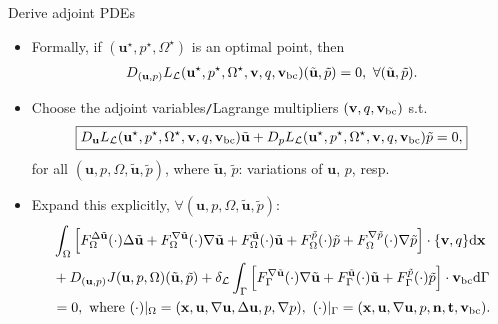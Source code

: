 \documentclass[10pt
hyperref={
    pdfauthor={Hong Quan Ba Nguyen},
    pdftitle={Optimal Shape Design of Air Ducts in Combustion Engines: Design a General Framework},
    pdfsubject={Talk},
    pdfcreator={LaTeX},
}
]{beamer}
\begin{document}
\begin{frame}{Derive adjoint PDEs}
    \begin{itemize}
        \item Formally, if $(\textbf{u}^\star,p^\star,\Omega^\star)$ is an optimal point, then
        \begin{align*}
            D_{(\textbf{u},p)}L_{\mathcal{L}}(\textbf{u}^\star,p^\star,\Omega^\star,\textbf{v},q,\textbf{v}_{\rm bc})(\tilde{\textbf{u}},\tilde{p}) = 0,\ \forall(\tilde{\textbf{u}},\tilde{p}).
        \end{align*}
        \item Choose the adjoint variables\texttt{/}Lagrange multipliers $(\textbf{v},q,\textbf{v}_{\rm bc})$ s.t.
        \begin{align*}
            \boxed{D_{\textbf{u}}L_{\mathcal{L}}(\textbf{u}^\star,p^\star,\Omega^\star,\textbf{v},q,\textbf{v}_{\rm bc})\tilde{\textbf{u}} + D_pL_{\mathcal{L}}(\textbf{u}^\star,p^\star,\Omega^\star,\textbf{v},q,\textbf{v}_{\rm bc})\tilde{p} = 0,}
        \end{align*}
        for all $(\textbf{u},p,\Omega,\tilde{\textbf{u}},\tilde{p})$, where $\tilde{\textbf{u}}$, $\tilde{p}$: variations of $\textbf{u}$, $p$, resp.
        \item Expand this explicitly, $\forall(\textbf{u},p,\Omega,\tilde{\textbf{u}},\tilde{p})$:
        \begin{align*}
            &\int_\Omega \left[F_\Omega^{\Delta\tilde{\textbf{u}}}(\cdot)\Delta\tilde{\textbf{u}} + F_\Omega^{\nabla\tilde{\textbf{u}}}(\cdot)\nabla\tilde{\textbf{u}} + F_\Omega^{\tilde{\textbf{u}}}(\cdot)\tilde{\textbf{u}} + F_\Omega^{\tilde{p}}(\cdot)\tilde{p} + F_\Omega^{\nabla\tilde{p}}(\cdot)\nabla\tilde{p}\right]\cdot\{\textbf{v},q\}{\rm d}\textbf{x}\\
            &+ D_{(\textbf{u},p)}J(\textbf{u},p,\Omega)(\tilde{\textbf{u}},\tilde{p}) + \delta_{\mathcal{L}}\int_\Gamma \left[F_\Gamma^{\nabla\tilde{\textbf{u}}}(\cdot)\nabla\tilde{\textbf{u}} + F_\Gamma^{\tilde{\textbf{u}}}(\cdot)\tilde{\textbf{u}} + F_\Gamma^{\tilde{p}}(\cdot)\tilde{p}\right]\cdot\textbf{v}_{\rm bc}{\rm d}\Gamma\\
            &= 0, \mbox{ where } (\cdot)|_\Omega = (\textbf{x},\textbf{u},\nabla\textbf{u},\Delta\textbf{u},p,\nabla p),\ (\cdot)|_\Gamma = (\textbf{x},\textbf{u},\nabla\textbf{u},p,\textbf{n},\textbf{t},\textbf{v}_{\rm bc}).
        \end{align*}
    \end{itemize}
\end{frame}
\end{document}

